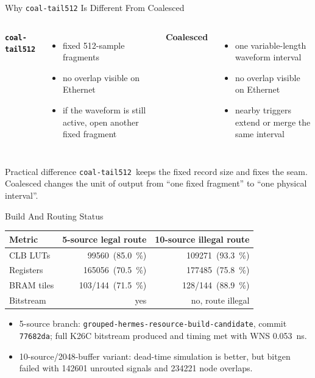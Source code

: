\documentclass[aspectratio=169]{beamer}
\newcommand{\coalbranch}{\texttt{coal-tail512}}
\newcommand{\groupcommit}{\texttt{77682da}}
\newcommand{\groupfivewns}{\SI{0.053}{\nano\second}}
\newcommand{\groupfiveluts}{\num{99560}}
\newcommand{\groupfivebram}{\num{103}/\num{144}}
\newcommand{\grouptenluts}{\num{109271}}
\newcommand{\grouptenbram}{\num{128}/\num{144}}
\begin{document}
\begin{frame}{Why \coalbranch{} Is Different From Coalesced}
\scriptsize
\begin{columns}[T,onlytextwidth]
\textbf{\coalbranch}
\begin{itemize}
  \item fixed \num{512}-sample fragments
  \item no overlap visible on Ethernet
  \item if the waveform is still active, open another fixed fragment
\end{itemize}

\textbf{Coalesced}
\begin{itemize}
  \item one variable-length waveform interval
  \item no overlap visible on Ethernet
  \item nearby triggers extend or merge the same interval
\end{itemize}
\end{columns}

\vspace{0.45em}
\begin{exampleblock}{Practical difference}
\coalbranch\ keeps the fixed record size and fixes the seam. Coalesced changes the unit of output from ``one fixed fragment'' to ``one physical interval''.
\end{exampleblock}
\end{frame}

\begin{frame}{Build And Routing Status}
\scriptsize
\centering
\begin{tabular}{@{}lrr@{}}
\toprule
Metric & 5-source legal route & 10-source illegal route \\
\midrule
CLB LUTs & \groupfiveluts\ (\SI{85.0}{\percent}) & \grouptenluts\ (\SI{93.3}{\percent}) \\
Registers & \num{165056}\ (\SI{70.5}{\percent}) & \num{177485}\ (\SI{75.8}{\percent}) \\
BRAM tiles & \groupfivebram\ (\SI{71.5}{\percent}) & \grouptenbram\ (\SI{88.9}{\percent}) \\
Bitstream & yes & no, route illegal \\
\bottomrule
\end{tabular}

\vspace{0.8em}
\raggedright
\begin{itemize}
  \item 5-source branch: \texttt{grouped-hermes-resource-build-candidate}, commit \groupcommit; full K26C bitstream produced and timing met with WNS \groupfivewns.
  \item 10-source/\num{2048}-buffer variant: dead-time simulation is better, but bitgen failed with \num{142601} unrouted signals and \num{234221} node overlaps.
\end{itemize}
\end{frame}
\end{document}
